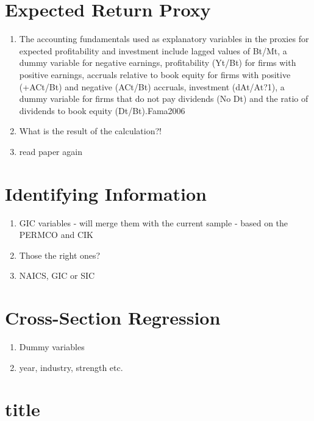 \documentclass{article}
\begin{document}
\section{Expected Return Proxy}

  \begin{enumerate}
    \item The accounting fundamentals used as explanatory variables in the proxies for expected profitability and investment include lagged values of Bt/Mt, a dummy variable for negative earnings, profitability (Yt/Bt) for firms with positive earnings, accruals relative to book
    equity for firms with positive (+ACt/Bt) and negative (ACt/Bt) accruals, investment (dAt/At?1), a dummy variable for firms that do not pay dividends (No Dt) and the ratio of dividends to book equity (Dt/Bt).{Fama2006}

    \item What is the result of the calculation?! 
    \item read paper again 
  \end{enumerate}

\section{Identifying Information}

\begin{enumerate}
  \item GIC variables - will merge them with the current sample - based on the PERMCO and CIK 
  \item Those the right ones? 
  \item NAICS, GIC or SIC
\end{enumerate}

\section{Cross-Section Regression}

\begin{enumerate}
  \item Dummy variables 
  \item year, industry, strength etc. 
\end{enumerate}

\section{title}
\end{document}
